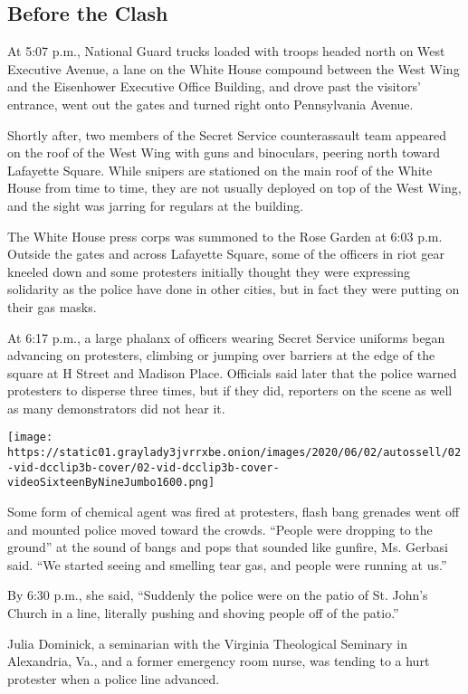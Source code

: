 \hypertarget{before-the-clash}{%
\subsection{Before the Clash}\label{before-the-clash}}

At 5:07 p.m., National Guard trucks loaded with troops headed north on
West Executive Avenue, a lane on the White House compound between the
West Wing and the Eisenhower Executive Office Building, and drove past
the visitors' entrance, went out the gates and turned right onto
Pennsylvania Avenue.

Shortly after, two members of the Secret Service counterassault team
appeared on the roof of the West Wing with guns and binoculars, peering
north toward Lafayette Square. While snipers are stationed on the main
roof of the White House from time to time, they are not usually deployed
on top of the West Wing, and the sight was jarring for regulars at the
building.

The White House press corps was summoned to the Rose Garden at 6:03 p.m.
Outside the gates and across Lafayette Square, some of the officers in
riot gear kneeled down and some protesters initially thought they were
expressing solidarity as the police have done in other cities, but in
fact they were putting on their gas masks.

At 6:17 p.m., a large phalanx of officers wearing Secret Service
uniforms began advancing on protesters, climbing or jumping over
barriers at the edge of the square at H Street and Madison Place.
Officials said later that the police warned protesters to disperse three
times, but if they did, reporters on the scene as well as many
demonstrators did not hear it.

\texttt{[image: https://static01.graylady3jvrrxbe.onion/images/2020/06/02/autossell/02-vid-dcclip3b-cover/02-vid-dcclip3b-cover-videoSixteenByNineJumbo1600.png]}

Some form of chemical agent was fired at protesters, flash bang grenades
went off and mounted police moved toward the crowds. ``People were
dropping to the ground'' at the sound of bangs and pops that sounded
like gunfire, Ms. Gerbasi said. ``We started seeing and smelling tear
gas, and people were running at us.''

By 6:30 p.m., she said, ``Suddenly the police were on the patio of St.
John's Church in a line, literally pushing and shoving people off of the
patio.''

Julia Dominick, a seminarian with the Virginia Theological Seminary in
Alexandria, Va., and a former emergency room nurse, was tending to a
hurt protester when a police line advanced.


